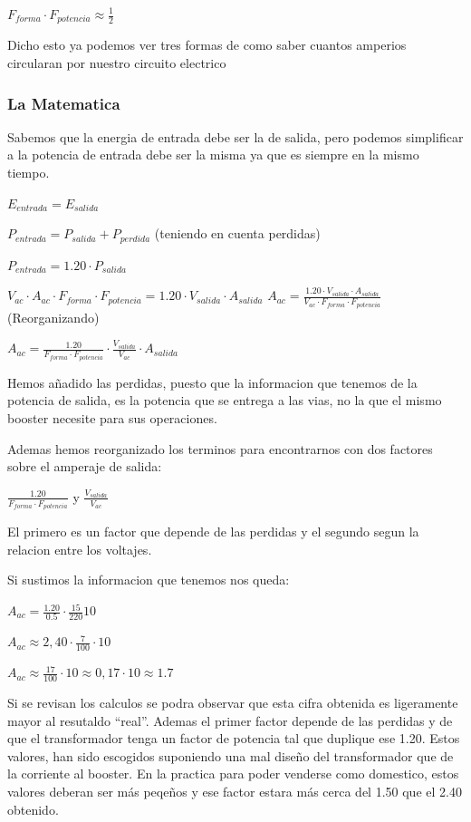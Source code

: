 $F_{forma} \cdot F_{potencia} \approx  \frac{1}{2} $

Dicho esto ya podemos ver tres formas de como saber cuantos amperios circularan por nuestro circuito electrico

\subsubsection{La Matematica}
Sabemos que la energia de entrada debe ser la de salida, pero podemos simplificar a la potencia de entrada debe ser la misma ya que es siempre en la mismo tiempo. 

$ E_{entrada} = E_{salida} $

$ P_{entrada} = P_{salida} + P_{perdida} $ (teniendo en cuenta perdidas)

$ P_{entrada} = 1.20 \cdot P_{salida} $

$ V_{ac} \cdot A_{ac} \cdot F_{forma} \cdot F_{potencia} = 1.20 \cdot V_{salida}\cdot A_{salida}$
$ A_{ac} = \frac{1.20 \cdot V_{salida}\cdot A_{salida}}{V_{ac} \cdot F_{forma} \cdot F_{potencia}} $ (Reorganizando)

$ A_{ac} = \frac{1.20}{F_{forma} \cdot F_{potencia}} \cdot\frac{V_{salida} }{V_{ac}} \cdot A_{salida} $

Hemos añadido las perdidas, puesto que la informacion que tenemos de la potencia de salida, es la potencia que se entrega a las vias, no la que  el mismo booster necesite para sus operaciones.

Ademas hemos reorganizado los terminos para encontrarnos con dos factores sobre el amperaje de salida:

$\frac{1.20}{F_{forma} \cdot F_{potencia}}$ y $\frac{V_{salida} }{V_{ac}} $

El primero es un factor que depende de las perdidas  y el segundo segun la relacion entre los voltajes.

Si sustimos la informacion que tenemos nos queda:

$A_{ac} =  \frac{1.20}{0.5}\cdot\frac{15}{220}{10}$

$A_{ac} \approx  2,40\cdot\frac{7}{100}\cdot {10}$

$A_{ac} \approx \frac{17}{100}\cdot{10} \approx 0,17\cdot 10 \approx 1.7$

Si se revisan los calculos se podra observar que esta cifra obtenida es ligeramente mayor al resutaldo ``real''. Ademas el primer factor depende de las perdidas y de que el transformador tenga un factor de potencia tal que duplique ese 1.20.
Estos valores, han sido escogidos suponiendo una mal diseño del transformador que de la corriente al booster. En la practica para poder venderse como domestico, estos valores deberan ser más peqeños y ese factor estara más cerca del 1.50 que el 2.40 obtenido.

